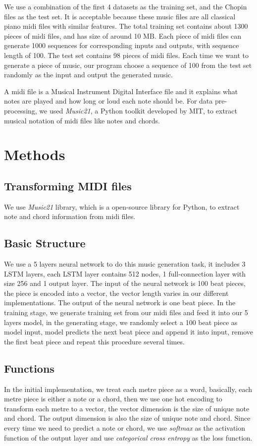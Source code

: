 \documentclass[conference]{IEEEtran}
\begin{document}
We use a combination of the first 4 datasets as the training set, and the Chopin files as the test set. It is acceptable because these music files are all classical piano midi files with similar features. The total training set contains about 1300 pieces of midi files, and has size of around 10 MB. Each piece of midi files can generate 1000 sequences for corresponding inputs and outputs, with sequence length of 100. The test set contains 98 pieces of midi files. Each time we want to generate a piece of music, our program choose a sequence of 100 from the test set randomly as the input and output the generated music.

A midi file is a Musical Instrument Digital Interface file and it explains what notes are played and how long or loud each note should be. For data pre-processing, we used \textit{Music21}, a Python toolkit developed by MIT, to extract musical notation of midi files like notes and chords.

\section{Methods}

\subsection{Transforming MIDI files}
We use \textit{Music21} library, which is a open-source library for Python, to extract note and chord information from midi files.

\subsection{Basic Structure}
We use a 5 layers neural network to do this music generation task, it includes 3 LSTM layers, each LSTM layer contains 512 nodes, 1 full-connection layer with size 256 and 1 output layer. The input of the neural network is 100 beat pieces, the piece is encoded into a vector, the vector length varies in our different implementations. The output of the neural network is one beat piece. In the training stage, we generate training set from our midi files and feed it into our 5 layers model, in the generating stage, we randomly select a 100 beat piece as model input, model predicts the next beat piece and append it into input, remove the first beat piece and repeat this procedure several times.

\subsection{Functions}
In the initial implementation, we treat each metre piece as a word, basically, each metre piece is either a note or a chord, then we use one hot encoding to transform each metre to a vector, the vector dimension is the size of unique note and chord. The output dimension is also the size of unique note and chord. Since every time we need to predict a note or chord, we use \textit{softmax} as the activation function of the output layer and use \textit{categorical cross entropy} as the loss function.
\end{document}
